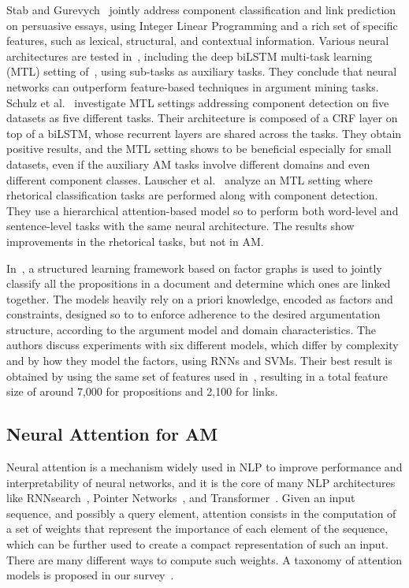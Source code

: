 \documentclass[journal]{IEEEtran}
\begin{document}
Stab and Gurevych~\cite{stab2017parsing} jointly address component classification and link prediction on persuasive essays, using Integer Linear Programming and a rich set of specific features, such as lexical, structural, and contextual information.
Various neural architectures are tested in~\cite{eger2017neural}, including the deep biLSTM multi-task learning (MTL) setting of~\cite{sogaard2016deep}, using sub-tasks as auxiliary tasks. They conclude that neural networks can outperform feature-based techniques in argument mining tasks.
Schulz et al.~\cite{N18-2006} investigate MTL settings addressing component detection on five datasets as five different tasks. Their architecture is composed of a CRF layer on top of a biLSTM, whose recurrent layers are shared across the tasks. They obtain positive results, and the MTL setting shows to be beneficial especially for small datasets, even if the auxiliary AM tasks involve different domains and even different component classes.
Lauscher et al.~\cite{D18-1370} analyze an MTL setting where rhetorical classification tasks are performed along with component detection. They use a hierarchical attention-based model so to perform both word-level and sentence-level tasks with the same neural architecture. The results show improvements in the rhetorical tasks, but not in AM.

In~\cite{DBLP:conf/acl/NiculaePC17}, a structured learning framework based on factor graphs is used to jointly classify all the propositions in a document and determine which ones are linked together.
The models heavily rely on a priori knowledge, encoded as factors and constraints, designed so to to enforce adherence to the desired argumentation structure, according to the argument model and domain characteristics.
The authors discuss experiments with six different models, which differ by complexity and by how they model the factors, using RNNs and SVMs. Their best result is obtained by using the same set of features used in~\cite{stab2017parsing}, resulting in a total feature size of around 7,000 for propositions and 2,100 for links.


\subsection{Neural Attention for AM}
Neural attention is a mechanism widely used in NLP to improve performance and interpretability of neural networks, and it is the core of many NLP architectures like RNNsearch~\cite{DBLP:journals/corr/BahdanauCB14}, Pointer Networks~\cite{vinyals2015pointer}, and Transformer~\cite{NIPS2017_7181}.
Given an input sequence, and possibly a query element, attention consists in the computation of a set of weights that represent the importance of each element of the sequence, which can be further used to create a compact representation of such an input.
There are many different ways to compute such weights. A taxonomy of attention models is proposed in our survey~\cite{attention-survey}.
\end{document}
